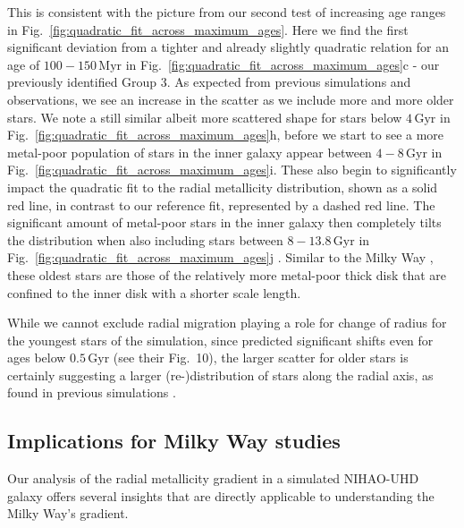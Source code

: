 \documentclass[twocolumn,apj,numberedappendix,appendixfloats]{openjournal}
\begin{document}
\begin{CJK*}{UTF8}{gbsn}
This is consistent with the picture from our second test of increasing age ranges in Fig.~\ref{fig:quadratic_fit_across_maximum_ages}. Here we find the first significant deviation from a tighter and already slightly quadratic relation for an age of $100-150\,\mathrm{Myr}$ in Fig.~\ref{fig:quadratic_fit_across_maximum_ages}c - our previously identified Group 3. As expected from previous simulations and observations, we see an increase in the scatter as we include more and more older stars. We note a still similar albeit more scattered shape for stars below $4\,\mathrm{Gyr}$ in  Fig.~\ref{fig:quadratic_fit_across_maximum_ages}h, before we start to see a more metal-poor population of stars in the inner galaxy appear between $4-8\,\mathrm{Gyr}$ in  Fig.~\ref{fig:quadratic_fit_across_maximum_ages}i. These also begin to significantly impact the quadratic fit to the radial metallicity distribution, shown as a solid red line, in contrast to our reference fit, represented by a dashed red line. The significant amount of metal-poor stars in the inner galaxy then completely tilts the distribution when also including stars between $8-13.8\,\mathrm{Gyr}$ in Fig.~\ref{fig:quadratic_fit_across_maximum_ages}j \citep[see also][]{Johnson2024}. Similar to the Milky Way \citep{BlandHawthorn_Gerhard2016}, these oldest stars are those of the relatively more metal-poor thick disk that are confined to the inner disk with a shorter scale length.

While we cannot exclude radial migration playing a role for change of radius for the youngest stars of the simulation, since \citet{Frankel2018} predicted significant shifts even for ages below $0.5\,\mathrm{Gyr}$ (see their Fig.~10), the larger scatter for older stars is certainly suggesting a larger (re-)distribution of stars along the radial axis, as found in previous simulations \citep{Minchev2010, Grand2015}.

\subsection{Implications for Milky Way studies} \label{sec:implications_milky_way}

Our analysis of the radial metallicity gradient in a simulated NIHAO-UHD galaxy offers several insights that are directly applicable to understanding the Milky Way's gradient.


\end{CJK*}
\end{document}
